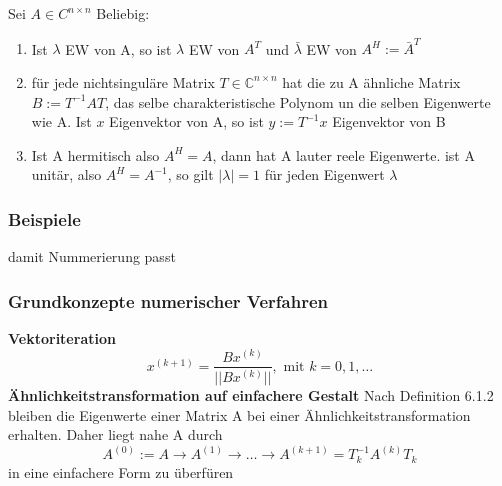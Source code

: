 \documentclass[
	ngerman,
	accentcolor=9c,%
	type=intern,
	marginpar=false
	]{tudapub}
\begin{document}
                \begin{definition}
                    Sei $A \in C^{n \times n}$ Beliebig:
                    \begin{enumerate}[label=\alph*)]
                        \item Ist $\lambda$ EW von A, so ist $\lambda$ EW von $A^T$ und $\bar\lambda$ EW von $A^H := \bar{A}^T$
                        \item für jede nichtsinguläre Matrix $T \in \mathbb{C}^{n \times n}$ hat die zu A ähnliche Matrix $B:= T^{-1}AT$,
                        das selbe charakteristische Polynom un die selben Eigenwerte wie A. Ist $x$ Eigenvektor von A,
                        so ist $y:= T^{-1}x$ Eigenvektor von B
                        \item Ist A hermitisch also $A^H = A$, dann hat A lauter reele Eigenwerte. ist A unitär, also
                        $A^H = A^{-1}$, so gilt $|\lambda|=1$ für jeden Eigenwert $\lambda$
                    \end{enumerate}
                \end{definition}
            \subsubsection{Beispiele}
                damit Nummerierung passt
            \subsubsection{Grundkonzepte numerischer Verfahren}
                \textbf{Vektoriteration}
                \begin{equation*}
                    x^{(k+1)} = \dfrac{Bx^{(k)}}{||Bx^{(k)}||}, \mbox{ mit } k=0,1,\dots
                \end{equation*}
                \textbf{Ähnlichkeitstransformation auf einfachere Gestalt}
                Nach Definition 6.1.2 bleiben die Eigenwerte einer Matrix A bei einer Ähnlichkeitstransformation erhalten.
                Daher liegt nahe A durch
                \begin{equation*}
                    A^{(0)}:= A \rightarrow A^{(1)} \rightarrow \dots \rightarrow A^{(k+1)} = T_k^{-1}A^{(k)}T_k
                \end{equation*}
                in eine einfachere Form zu überfüren
\end{document}
